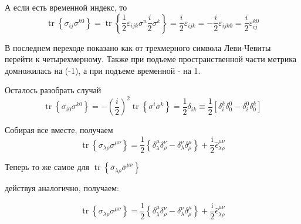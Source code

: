 \documentclass[a4paper,12pt]{article} %
\begin{document}
\begin{task}
А если есть временной индекс, то 
\[ \operatorname{tr}\left\{\sigma_{ij } \sigma^{k0}\right\}=
\operatorname{tr}\left\{\frac{1}{2}\varepsilon_{ijk}\sigma^n \frac{i}{2}\sigma^k\right\}=
\frac{i}{2}\varepsilon_{ijk}=-\frac{i}{2}\varepsilon_{ijk0}=\frac{i}{2}\varepsilon_{ij}^{k0}\]

В последнем переходе показано как от трехмерного символа Леви-Чевиты перейти к четырехмерному.
Также при подъеме пространственной части метрика домножилась на (-1), а при подъеме временной - на 1.

Осталось разобрать случай 
\[ \operatorname{tr}\left\{\sigma_{i0} \sigma^{k0}\right\}=-\left(\frac{i}{2}\right)^2
\operatorname{tr}\left\{\sigma^i\sigma^k\right\}=
\frac{1}{2}\delta_{ik}\equiv 
\frac{1}{2}[\delta_i^k\delta_0^0-\delta_i^0\delta_0^k]\]

Собирая все вместе, получаем
\[ \operatorname{tr}\left\{\sigma_{\lambda \rho} \sigma^{\mu \nu}\right\}=
\frac{1}{2}\left\{\delta_{\lambda}^{\mu} \delta_{\rho}^{\nu}-\delta_{\lambda}^{\nu} \delta_{\rho}^{\mu}\right\}+
\frac{\mathrm{i}}{2} \hat{\epsilon}_{\lambda \rho}^{\mu \nu}
 \]



Теперь то же самое для $ \operatorname{tr}\left\{\bar{\sigma}_{\lambda \rho} \bar{\sigma}^{\mu \nu}\right\} $



действуя аналогично, получаем:


\[ \operatorname{tr}\left\{\sigma_{\lambda \rho} \sigma^{\mu \nu}\right\}=
\frac{1}{2}\left\{\delta_{\lambda}^{\mu} \delta_{\rho}^{\nu}-\delta_{\lambda}^{\nu} \delta_{\rho}^{\mu}\right\}+
\frac{\mathrm{i}}{2} \hat{\epsilon}_{\lambda \rho}^{\mu \nu}
 \]


\end{task}
\end{document}
